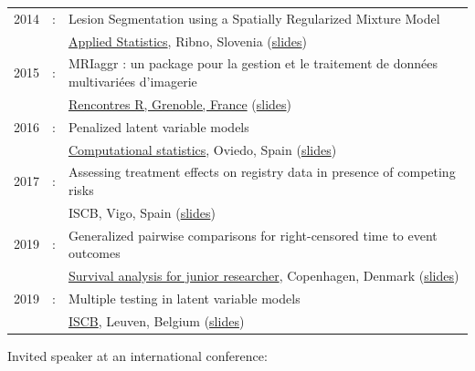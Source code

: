 \documentclass[12pt]{article}
\begin{document}
\begin{tabular}{l@{ }l@{ }l}
2014 &:& Lesion Segmentation using a Spatially Regularized Mixture Model \\
&& \href{http://conferences.nib.si/AS2014/default.htm}{Applied Statistics}, Ribno, Slovenia \hfill (\href{https://bozenne.github.io/doc/Talks/2014-Applied_statistics-Lesion_Segmentation.pdf}{slides}) \\ [3mm]
2015 &:& MRIaggr : un package pour la gestion et le traitement de données multivariées d'imagerie\\
&& \href{https://r2015-grenoble.sciencesconf.org/66037}{Rencontres R, Grenoble, France}  \hfill   (\href{https://bozenne.github.io/doc/Talks/2015-R-MRIaggr.pdf}{slides})  \\ [3mm]
2016 &:& Penalized latent variable models  \\
&& \href{http://cmstatistics.org/RegistrationsV2/COMPSTAT2016/viewSubmission.php?in=440&token=29584n1s18p97n65o7p1r5n36sopq0n4}{Computational statistics}, Oviedo, Spain \hfill (\href{https://bozenne.github.io/doc/Talks/2016-Compstat-pLVM.pdf}{slides}) \\ [3mm]
2017 &:& Assessing treatment effects on registry data in presence of competing risks \\ 
&& ISCB, Vigo, Spain \hfill (\href{https://bozenne.github.io/doc/Talks/2017-ISCB-ate.pdf}{slides}) \\ [3mm]
2019 &:& Generalized pairwise comparisons for right-censored time to event outcomes \\
&& \href{https://publicifsv.sund.ku.dk/~safjr2019/}{Survival analysis for junior researcher}, Copenhagen, Denmark \hfill (\href{https://bozenne.github.io/doc/Talks/2019-prezSAfJR-GPC.pdf}{slides}) \\ [3mm]
2019 &:& Multiple testing in latent variable models \\
&& \href{https://kuleuvencongres.be/iscb40/}{ISCB}, Leuven, Belgium \hfill (\href{https://bozenne.github.io/doc/Talks/2019-ISCB-multcomp_LVM.pdf}{slides}) \\
\end{tabular}

\bigskip

Invited speaker at an international conference: 

\medskip
\end{document}
